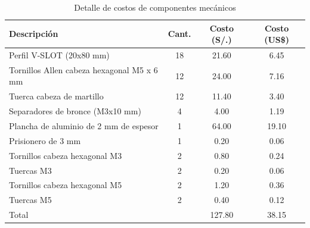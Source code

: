 \begin{table}[H]
\centering
\caption{Detalle de costos de componentes mecánicos}
\label{tab:anexo_costos_mecanicos}

\vspace{0.5em}

\begin{tabular}{|p{7cm}|c|c|c|}
\hline
Descripción & Cant. & Costo (S/.) & Costo (US\$) \\
\hline
Perfil V-SLOT (20x80 mm) & 18 & 21.60 & 6.45 \\
\hline
Tornillos Allen cabeza hexagonal M5 x 6 mm & 12 & 24.00 & 7.16 \\
\hline
Tuerca cabeza de martillo & 12 & 11.40 & 3.40 \\
\hline
Separadores de bronce (M3x10 mm) & 4 & 4.00 & 1.19 \\
\hline
Plancha de aluminio de 2 mm de espesor & 1 & 64.00 & 19.10 \\
\hline
Prisionero de 3 mm & 1 & 0.20 & 0.06 \\
\hline
Tornillos cabeza hexagonal M3 & 2 & 0.80 & 0.24 \\
\hline
Tuercas M3 & 2 & 0.20 & 0.06 \\
\hline
Tornillos cabeza hexagonal M5 & 2 & 1.20 & 0.36 \\
\hline
Tuercas M5 & 2 & 0.40 & 0.12 \\
\hline
Total &  & 127.80 & 38.15 \\
\hline
\end{tabular}
\end{table}
